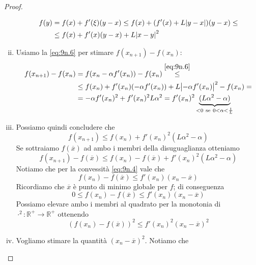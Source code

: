 \begin{proof}
\begin{enumerate}[(i)]
\begin{equation}
                \label{eq:9n.6}
                \begin{split}
                    f(y) & = f(x)+f'(\xi)(y-x) \le f(x) + (f'(x)+L\abs{y-x})(y-x) \le \\
                & \le f(x)+f'(x)(y-x)+L\abs{x-y}^2
                \end{split}
            \end{equation}
            \item Usiamo la \eqref{eq:9n.6} per stimare $f(x_{n+1})-f(x_n)$:
            \begin{equation}
                \label{eq:9n.7}
                \begin{split}
                    f(x_{n+1})-f(x_n) &  = f(x_{n}-\alpha f'(x_n))-f(x_n) \overset{\eqref{eq:9n.6}}{\le }\\
                    & \le f(x_n) +f'(x_n)(-\alpha f'(x_n))+L\abs{-\alpha f'(x_n)}^2 -f(x_n)= \\
                    & = -\alpha f'(x_n)^2 + f'(x_n)^2 L \alpha^2 = f'(x_n)^2\underbrace{(L\alpha^2-\alpha)}_{<0 \ \text{se} \ 0<\alpha<\frac{1}{L}}
                \end{split}
            \end{equation}
            \item Possiamo quindi concludere che 
            \[
            f(x_{n+1})\le f(x_n) + f'(x_n)^2(L\alpha^2-\alpha)
            \]
            Se sottraiamo $f(\overline{x})$ ad ambo i membri della disuguaglianza otteniamo
            \begin{equation}
                \label{eq:9n.12}
                f(x_{n+1})-f(\overline{x})\le f(x_n)-f(\overline{x}) +f'(x_n)^2(L\alpha^2 -\alpha)
            \end{equation}
            Notiamo che per la convessità \eqref{eq:9n.4} vale che
            \[
            f(x_n)-f(\overline{x}) \le f'(x_n)(x_n-\overline{x})
            \]
            Ricordiamo che $\overline{x}$ è punto di minimo globale per $f$; di conseguenza 
            \[
                0\le f(x_n)-f(\overline{x}) \le f'(x_n)(x_n-\overline{x})
            \]
            Possiamo elevare ambo i membri al quadrato per la monotonia di $\cdot^2\colon \mathbb{R}^+ \to\mathbb{R}^+$ ottenendo
            \begin{equation}
                \label{eq:9n.8}
                (f(x_n)-f(\overline{x}))^2\le f'(x_n)^2(x_n-\overline{x})^2
            \end{equation}
            \item Vogliamo stimare la quantità $(x_n-\overline{x})^2$. Notiamo che

\end{enumerate}
\end{proof}
